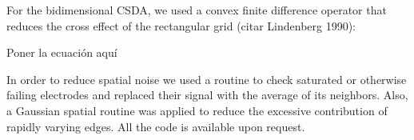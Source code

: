 For the bidimensional CSDA, we used a convex finite difference operator that
reduces the cross effect of the rectangular grid (citar Lindenberg 1990):

{Poner la ecuación aquí}

In order to reduce spatial noise we used a routine to check saturated or
otherwise failing electrodes and replaced their signal with the average
of its neighbors. Also, a Gaussian spatial routine was applied to reduce
the excessive contribution of rapidly varying edges. All the code is available
upon request.



